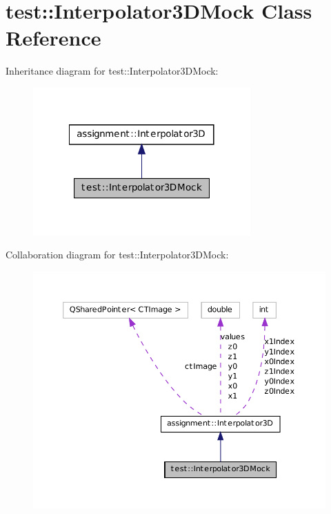 \hypertarget{classtest_1_1_interpolator3_d_mock}{
\section{test::Interpolator3DMock Class Reference}
\label{classtest_1_1_interpolator3_d_mock}
}


Inheritance diagram for test::Interpolator3DMock:\nopagebreak
\begin{figure}[H]
\begin{center}
\leavevmode
\includegraphics[width=236pt]{classtest_1_1_interpolator3_d_mock__inherit__graph}
\end{center}
\end{figure}


Collaboration diagram for test::Interpolator3DMock:\nopagebreak
\begin{figure}[H]
\begin{center}
\leavevmode
\includegraphics[width=385pt]{classtest_1_1_interpolator3_d_mock__coll__graph}
\end{center}
\end{figure}

